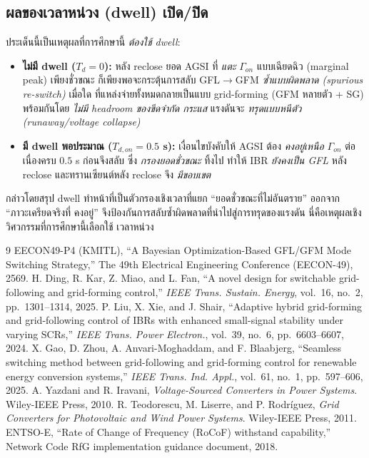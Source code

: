 \documentclass[12pt,a4paper]{article}
\begin{document}
\subsection{ผลของเวลาหน่วง (dwell) เปิด/ปิด}
ประเด็นนี้เป็นเหตุผลที่การศึกษานี้ \emph{ต้องใช้ dwell}:
\begin{itemize}
\item \textbf{ไม่มี dwell ($T_d=0$):} หลัง reclose ยอด AGSI ที่ \emph{แตะ} $\Gamma_{on}$ แบบเฉียดฉิว (marginal
peak) เพียงชั่วขณะ ก็เพียงพอจะกระตุ้นการสลับ GFL$\to$GFM \emph{ซ้ำแบบผิดพลาด (spurious re-switch)} เมื่อใด
ที่แหล่งจ่ายทั้งหมดกลายเป็นแบบ grid-forming (GFM หลายตัว + SG) พร้อมกันโดย \emph{ไม่มี headroom ของขีดจำกัด
กระแส} แรงดันจะ \emph{ทรุดแบบหนีตัว (runaway/voltage collapse)}
\item \textbf{มี dwell พอประมาณ ($T_{d,on}=0.5$ s):} เงื่อนไขบังคับให้ AGSI ต้อง \emph{คงอยู่เหนือ}
$\Gamma_{on}$ ต่อเนื่องครบ $0.5$ s ก่อนจึงสลับ ซึ่ง \emph{กรองยอดชั่วขณะ} ทิ้งไป ทำให้ IBR \emph{ยังคงเป็น GFL}
หลัง reclose และทรานเซียนต์หลัง reclose จึง \emph{มีขอบเขต}
\end{itemize}
กล่าวโดยสรุป dwell ทำหน้าที่เป็นตัวกรองเชิงเวลาที่แยก ``ยอดชั่วขณะที่ไม่อันตราย'' ออกจาก ``ภาวะเครียดจริงที่
คงอยู่'' จึงป้องกันการสลับซ้ำผิดพลาดที่นำไปสู่การทรุดของแรงดัน นี่คือเหตุผลเชิงวิศวกรรมที่การศึกษานี้เลือกใช้
เวลาหน่วง

\begin{thebibliography}{9}
 EECON49-P4 (KMITL), ``A Bayesian Optimization-Based GFL/GFM Mode Switching
Strategy,'' The 49th Electrical Engineering Conference (EECON-49), 2569.
 H. Ding, R. Kar, Z. Miao, and L. Fan, ``A novel design for switchable
grid-following and grid-forming control,'' \emph{IEEE Trans. Sustain. Energy}, vol.~16, no.~2,
pp.~1301--1314, 2025.
 P. Liu, X. Xie, and J. Shair, ``Adaptive hybrid grid-forming and grid-following
control of IBRs with enhanced small-signal stability under varying SCRs,'' \emph{IEEE Trans. Power
Electron.}, vol.~39, no.~6, pp.~6603--6607, 2024.
 X. Gao, D. Zhou, A. Anvari-Moghaddam, and F. Blaabjerg, ``Seamless switching method
between grid-following and grid-forming control for renewable energy conversion systems,'' \emph{IEEE
Trans. Ind. Appl.}, vol.~61, no.~1, pp.~597--606, 2025.
 A. Yazdani and R. Iravani, \emph{Voltage-Sourced Converters in Power Systems}.
Wiley-IEEE Press, 2010.
 R. Teodorescu, M. Liserre, and P. Rodr\'iguez, \emph{Grid Converters for
Photovoltaic and Wind Power Systems}. Wiley-IEEE Press, 2011.
 ENTSO-E, ``Rate of Change of Frequency (RoCoF) withstand capability,''
Network Code RfG implementation guidance document, 2018.
\end{thebibliography}
\end{document}
